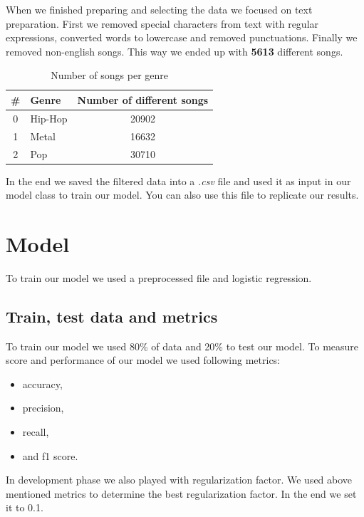 \documentclass[a4paper,11pt]{article}
\begin{document}
When we finished preparing and selecting the data we focused on text preparation. First we removed special characters from text with regular expressions, converted words to lowercase and removed punctuations. Finally we removed non-english songs. This way we ended up with \textbf{5613} different songs.

\begin{table}[h!]
\centering
\label{baseline}
\begin{tabular}{|clc|}
\hline
\# & Genre & Number of different songs \\
\hline
0 & Hip-Hop & 20902 \\
1 & Metal & 16632 \\
2 & Pop & 30710 \\
\hline
\end{tabular}
\caption{Number of songs per genre}
\end{table}

In the end we saved the filtered data into a \textit{.csv} file and used it as input in our model class to train our model. You can also use this file to replicate our results.

\section{Model}

To train our model we used a preprocessed file and logistic regression.

\subsection{Train, test data and metrics}
To train our model we used 80\% of data and 20\% to test our model. To measure score and performance of our model we used following metrics:
\begin{itemize}
\item accuracy,
\item precision,
\item recall,
\item and f1 score.
\end{itemize}

In development phase we also played with regularization factor. We used above mentioned metrics to determine the best regularization factor. In the end we set it to 0.1.
\end{document}
